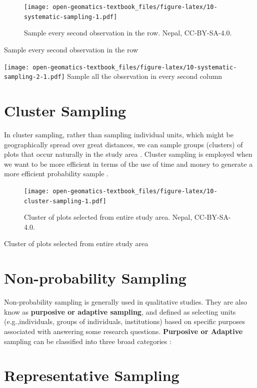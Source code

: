 \documentclass[
]{book}
\begin{document}
\begin{figure}
\centering
\texttt{[image: open-geomatics-textbook\_files/figure-latex/10-systematic-sampling-1.pdf]}
\caption{\label{fig:10-systematic-sampling}Sample every second observation in the row. Nepal, CC-BY-SA-4.0.}
\end{figure}

Sample every second observation in the row

\texttt{[image: open-geomatics-textbook\_files/figure-latex/10-systematic-sampling-2-1.pdf]}
Sample all the observation in every second column

\hypertarget{cluster-sampling}{%
\section{Cluster Sampling}\label{cluster-sampling}}

In cluster sampling, rather than sampling individual units, which might be geographically spread over great distances, we can sample groups (clusters) of plots that occur naturally in the study area \citep{teddlie_mixed_2007}. Cluster sampling is employed when we want to be more efficient in terms of the use of time and money to generate a more efficient probability sample \citep{teddlie_mixed_2007}.

\begin{figure}
\centering
\texttt{[image: open-geomatics-textbook\_files/figure-latex/10-cluster-sampling-1.pdf]}
\caption{\label{fig:10-cluster-sampling}Cluster of plots selected from entire study area. Nepal, CC-BY-SA-4.0.}
\end{figure}

Cluster of plots selected from entire study area

\hypertarget{non-probability-sampling}{%
\section{Non-probability Sampling}\label{non-probability-sampling}}

Non-probability sampling is generally used in qualitative studies. They are also know as \textbf{purposive or adaptive sampling}, and defined as selecting units (e.g.,individuals, groups of individuals, institutions) based on specific purposes associated with answering some research questions. \textbf{Purposive or Adaptive} sampling can be classified into three broad categories \citep{teddlie_mixed_2007}:

\hypertarget{representative-sampling}{%
\section{Representative Sampling}\label{representative-sampling}}
\end{document}
